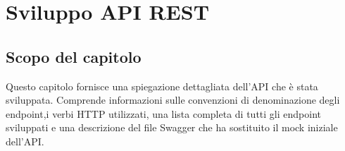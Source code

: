 \chapter{Sviluppo API REST}
\label{cap:api-rest}

\section{Scopo del capitolo}
Questo capitolo fornisce una spiegazione dettagliata dell'API che è stata sviluppata. Comprende informazioni sulle convenzioni di denominazione degli endpoint,i verbi HTTP utilizzati, una lista completa di tutti gli endpoint sviluppati e una descrizione del file Swagger che ha sostituito il mock iniziale dell'API.



